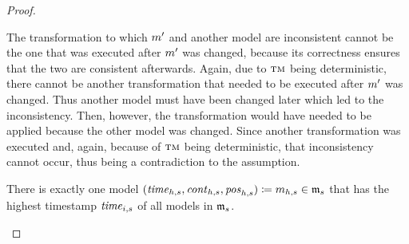 \begin{proof}
\begin{longenumerate}
            The transformation to which $\model{m}{}'$ and another model are inconsistent cannot be the one that was executed after $\model{m}{}'$ was changed, because its correctness ensures that the two are consistent afterwards.
            Again, due to $\textsc{tm}$ being deterministic, there cannot be another transformation that needed to be executed after $\model{m}{}'$ was changed. Thus another model must have been changed later which led to the inconsistency. Then, however, the transformation would have needed to be applied because the other model was changed.
            Since another transformation was executed and, again, because of $\textsc{tm}$ being deterministic, that inconsistency cannot occur, thus being a contradiction to the assumption.
        \item 
            There is exactly one model $(\mathvariable{time}_{h,s},\mathvariable{cont}_{h,s},\mathvariable{pos}_{h,s}) \equalsperdefinition \model{m}{h,s} \in \modeltuple{m}_{s}$ that has the highest timestamp $\mathit{time}_{i,s}$ of all models in $\modeltuple{m}_{s}$.

\end{longenumerate}
\end{proof}
